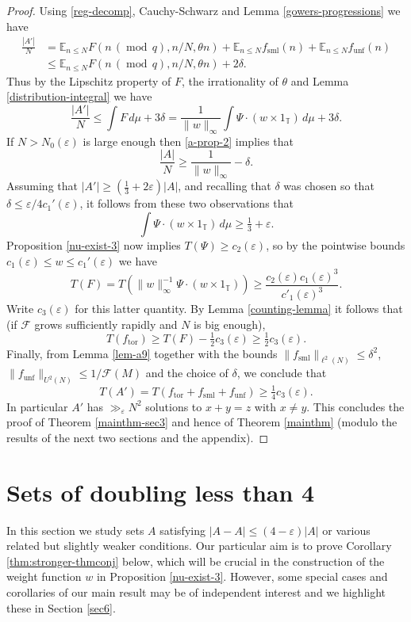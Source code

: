 \documentclass[10pt,reqno]{amsart}
\theoremstyle{definition}
\theoremstyle{remark}
\newcommand{\md}[1]{\ensuremath{\,(\operatorname{mod}\, #1)}}
\renewcommand{\leq}{\leqslant}
\renewcommand{\geq}{\geqslant}
\newcommand\tor{\operatorname{tor}}
\newcommand\sml{\operatorname{sml}}
\newcommand\unf{\operatorname{unf}}
\def\E{\mathbb{E}}
\def\T{\mathbb{T}}
\def\eps{\varepsilon}
\numberwithin{equation}{section}
\begin{document}
\begin{proof}
Using \eqref{reg-decomp}, Cauchy-Schwarz and Lemma \ref{gowers-progressions} we have
\begin{align*}
	\frac{|A'|}{N}
		&= \E_{n \leq N} F(n \md{q}, n/N, \theta n) + \E_{n \leq N} f_{\sml}(n) + \E_{n \leq N} f_{\unf}(n) \\
		&\leq \E_{n \leq N} F(n \md{q}, n/N, \theta n)  + 2\delta.
\end{align*}
Thus by the Lipschitz property of $F$, the irrationality of $\theta$ and Lemma \ref{distribution-integral} we have
\[
	\frac{|A'|}{N} \leq \int F\, d\mu + 3\delta = \frac{1}{\|w\|_\infty} \int\Psi\cdot(w\times 1_{\T})\,d\mu + 3\delta.
\]
If $N>N_0(\eps)$ is large enough then \eqref{a-prop-2} implies that
\[ \frac{|A|}{N} \geq \frac{1}{\|w\|_{\infty}} - \delta.\] Assuming that $|A'| \geq (\frac{1}{3} + 2\eps) |A|$, and recalling that $\delta$ was chosen so that $\delta \leq \eps/4 c_1'(\eps)$, it follows from these two observations that
\[\int \Psi \cdot (w \times 1_{\T}) \, d\mu\geq \tfrac{1}{3} + \eps.\]
Proposition \ref{nu-exist-3} now implies $T(\Psi) \geq c_2(\eps)$, so by the pointwise bounds $c_1(\eps)\leq w \leq c_1'(\eps)$ we have
\[ T(F) = T\left(\|w\|_\infty^{-1}\Psi\cdot(w \times 1_{\T})\right)\geq \frac{c_2(\eps) c_1(\eps)^3} {c'_1(\eps)^3}.\] Write $c_3(\eps)$ for this latter quantity. By Lemma \ref{counting-lemma} it follows that (if $\mathcal{F}$ grows sufficiently rapidly and $N$ is big enough),
\[T(f_{\tor}) \geq T(F) - \tfrac{1}{2}c_3(\eps) \geq \tfrac{1}{2}c_3(\eps).\]
Finally, from Lemma \ref{lem-a9} together with the bounds $\| f_{\sml} \|_{\ell^2(N)} \leq \delta^2$, $\| f_{\unf} \|_{U^2(N)} \leq 1/\mathcal{F}(M)$ and the choice of $\delta$, we conclude that
\[ T(A') = T(f_{\tor} + f_{\sml} + f_{\unf}) \geq \tfrac{1}{4} c_3(\eps).\]
In particular $A'$ has $\gg_{\eps} N^2$ solutions to $x + y = z$ with $x\neq y$. This concludes the proof of Theorem \ref{mainthm-sec3} and hence of Theorem \ref{mainthm} (modulo the results of the next two sections and the appendix).
\end{proof}



\section{Sets of doubling less than 4}\label{sec4}

\def\Sym{\operatorname{D}}
\def\struct{\operatorname{struct}}

In this section we study sets $A$ satisfying $|A - A| \leq (4-\eps)|A|$ or various related but slightly weaker conditions. Our particular aim is to prove Corollary \ref{thm:stronger-thmconj} below, which will be crucial in the construction of the weight function $w$ in Proposition \ref{nu-exist-3}. However, some special cases and corollaries of our main result may be of independent interest and we highlight these in Section \ref{sec6}.
\end{document}
